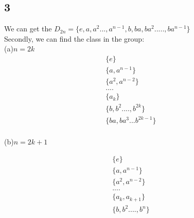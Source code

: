 \documentclass{article}
\begin{document}
\begin{CJK*}{GBK}{song}
\section{3}
We can get the $D_{2n}=\{e,a,a^2...,a^{n-1},b,ba,ba^2.....,ba^{n-1}\}$\\
Secondly, we can find the class in the group:\\
(a)$n=2k$
\begin{equation}
\begin{aligned}
\{e\}&\\
\{a,a^{n-1}\}&\\
\{a^2,a^{n-2}\}&\\
....\\
\{a_k\}&\\
\{b,b^2....,b^{2k}\}&\\
\{ba,ba^{3}...b^{2k-1}\}&\\
\end{aligned}
\end{equation}

(b)$n=2k+1$

\begin{equation}
\begin{aligned}
\{e\}&\\
\{a,a^{n-1}\}&\\
\{a^2,a^{n-2}\}&\\
....\\
\{a_k,a_{k+1}\}&\\
\{b,b^2....,b^{n}\}&\\
\end{aligned}
\end{equation}























\end{CJK*}
\end{document}
